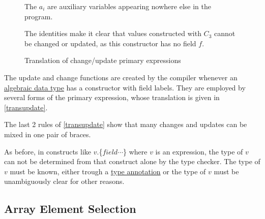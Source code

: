 \begin{figure}[hbt]
{    
\par The $a_i$ are auxiliary variables appearing nowhere else in the program. 
\par The identities make it clear that values constructed with $C_3$ cannot be changed or updated, as this constructor has no field $f$.
}
\caption{Translation of change/update primary expressions}
\label{transupdate}
\end{figure}

The update and change functions are created by the compiler whenever an \hyperref[algdcl]{algebraic data type} has a constructor with field labels. They are employed by several forms of the primary expression, whose translation is given in \autoref{transupdate}.

The last 2 rules of  \autoref{transupdate} show that many changes and updates can be mixed in one pair of braces. 

As before, in constructs like $v$.\{$field \cdots$\} where $v$ is an expression, the type of $v$ can not be determined from that construct alone by the type checker. The type of $v$ must be known, either trough a \hyperref[annotation]{type annotation} or the type of $v$ must be unambiguously clear for other reasons.  

\subsection{Array Element Selection} \label{arrayop}


